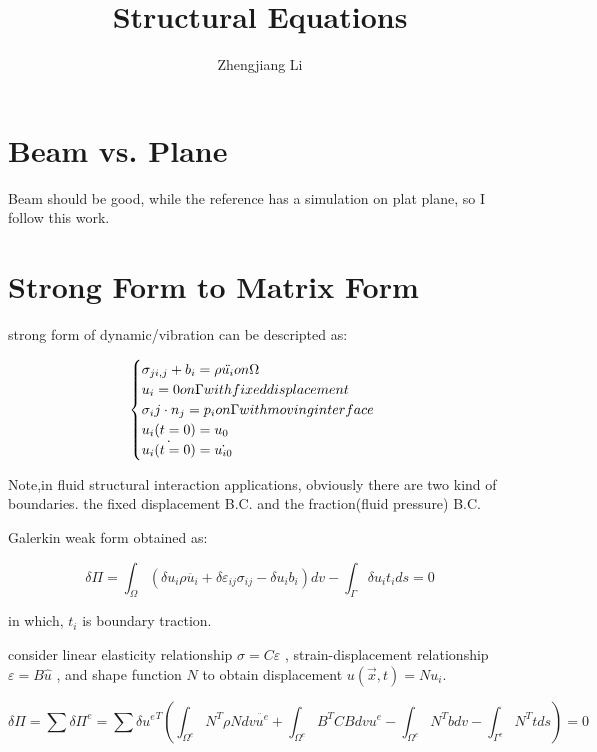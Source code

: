 \documentclass[11pt]{article}
\begin{document}
\title{Structural Equations}

\author{Zhengjiang Li}

\date{}

\maketitle

\section{Beam vs. Plane}
Beam should be good, while the reference has a simulation on plat plane, so I follow this work.

\section{Strong Form to Matrix Form}

strong form of dynamic/vibration can be descripted as:
  
  \[
  \begin{cases}
  $$ \sigma_{ji,j} + b_i = \rho \ddot{u_i} on \Omega $$ \\
  $$ u_i = 0  on \Gamma with fixed displacement $$ \\
  $$ \sigma_ij \cdot n_j = p_i on \Gamma with moving interface $$ \\
  $$ u_i(t=0) = u_0$$ \\
  $$ \dot{u_i(t=0)} = \dot{u_{i0}} $$ 
  \end{cases} 
  \]

Note,in fluid structural interaction applications, obviously there are two kind of boundaries. the fixed displacement B.C. and the fraction(fluid pressure) B.C.

Galerkin weak form obtained as:

  $$ \delta \Pi =  \int_{\Omega} (\delta u_i \rho \ddot{u_i} + \delta \varepsilon_{ij} \sigma_{ij} - \delta u_i b_i )dv  - \int_{\Gamma} \delta u_i t_i ds = 0 $$

 in which, $t_i$ is boundary traction.

 
consider linear elasticity relationship $ \sigma = C \varepsilon $
, strain-displacement relationship $ \varepsilon = B \hat{u}$ , and shape function $N$ to obtain displacement $u(\vec{x}, t) = N u_i$.

 $$ \delta \Pi = \sum {\delta \Pi}^e = \sum \delta {u^e}^T (\int_{\Omega^e} N^T \rho N dv \ddot{u^e} + \int_{\Omega^e} B^T C B dv {u^e} - \int_{\Omega^e} N^T b dv - \int_{\Gamma^e} N^T t ds ) = 0 $$
\end{document}
